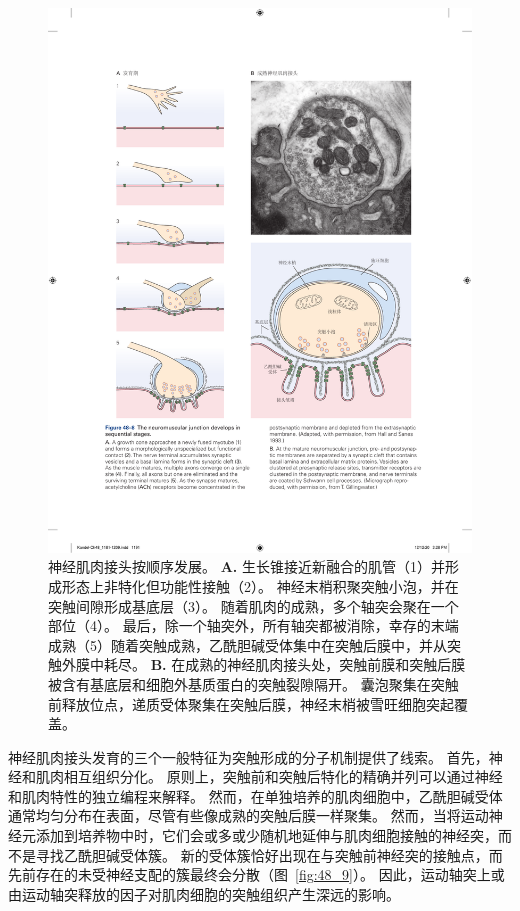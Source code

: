 \begin{figure}[htbp]
	\centering
	\includegraphics[width=1.0\linewidth]{chap48/fig_48_8}
	\caption{神经肌肉接头按顺序发展。
		\textbf{A.} 生长锥接近新融合的肌管（1）并形成形态上非特化但功能性接触（2）。
		神经末梢积聚突触小泡，并在突触间隙形成基底层（3）。
		随着肌肉的成熟，多个轴突会聚在一个部位（4）。
		最后，除一个轴突外，所有轴突都被消除，幸存的末端成熟（5）随着突触成熟，乙酰胆碱受体集中在突触后膜中，并从突触外膜中耗尽\cite{hall1993synaptic}。
		\textbf{B.} 在成熟的神经肌肉接头处，突触前膜和突触后膜被含有基底层和细胞外基质蛋白的突触裂隙隔开。
		囊泡聚集在突触前释放位点，递质受体聚集在突触后膜，神经末梢被雪旺细胞突起覆盖。}
	\label{fig:48_8}
\end{figure}


神经肌肉接头发育的三个一般特征为突触形成的分子机制提供了线索。 
首先，神经和肌肉相互组织分化。
原则上，突触前和突触后特化的精确并列可以通过神经和肌肉特性的独立编程来解释。
然而，在单独培养的肌肉细胞中，乙酰胆碱受体通常均匀分布在表面，尽管有些像成熟的突触后膜一样聚集。
然而，当将运动神经元添加到培养物中时，它们会或多或少随机地延伸与肌肉细胞接触的神经突，而不是寻找乙酰胆碱受体簇。
新的受体簇恰好出现在与突触前神经突的接触点，而先前存在的未受神经支配的簇最终会分散（图~\ref{fig:48_9}）。
因此，运动轴突上或由运动轴突释放的因子对肌肉细胞的突触组织产生深远的影响。


